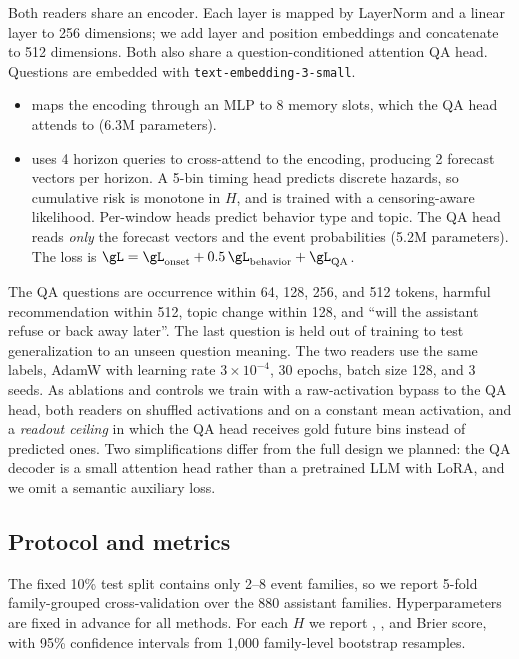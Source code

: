 Both readers share an encoder. Each layer is mapped by LayerNorm and a linear layer to 256 dimensions; we add layer and position embeddings and concatenate to 512 dimensions. Both also share a question-conditioned attention QA head. Questions are embedded with \texttt{text-embedding-3-small}.
\begin{itemize}[leftmargin=*,itemsep=0pt,topsep=0pt]
    \item \direct maps the encoding through an MLP to 8 memory slots, which the QA head attends to (6.3M parameters).
    \item \forecast uses 4 horizon queries to cross-attend to the encoding, producing 2 forecast vectors per horizon. A 5-bin timing head predicts discrete hazards, so cumulative risk is monotone in $H$, and is trained with a censoring-aware likelihood. Per-window heads predict behavior type and topic. The QA head reads \emph{only} the forecast vectors and the event probabilities (5.2M parameters). The loss is $\gL = \gL_{\text{onset}} + 0.5\,\gL_{\text{behavior}} + \gL_{\text{QA}}$.
\end{itemize}
The QA questions are occurrence within 64, 128, 256, and 512 tokens, harmful recommendation within 512, topic change within 128, and ``will the assistant refuse or back away later''. The last question is held out of training to test generalization to an unseen question meaning. The two readers use the same labels, AdamW with learning rate $3{\times}10^{-4}$, 30 epochs, batch size 128, and 3 seeds. As ablations and controls we train \forecast with a raw-activation bypass to the QA head, both readers on shuffled activations and on a constant mean activation, and a \emph{readout ceiling} in which the QA head receives gold future bins instead of predicted ones. Two simplifications differ from the full design we planned: the QA decoder is a small attention head rather than a pretrained LLM with LoRA, and we omit a semantic auxiliary loss.

\subsection{Protocol and metrics}
\label{sec:protocol}
The fixed 10\% test split contains only 2--8 event families, so we report 5-fold family-grouped cross-validation over the 880 assistant families. Hyperparameters are fixed in advance for all methods. For each $H$ we report \auroc, \auprc, and Brier score, with 95\% confidence intervals from 1,000 family-level bootstrap resamples.

